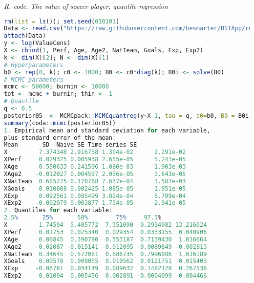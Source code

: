 \begin{tcolorbox}[enhanced,width=4.67in,center upper,
	fontupper=\large\bfseries,drop shadow southwest,sharp corners]
	\textit{R. code. The value of soccer player, quantile regression}
	\begin{VF}
		\begin{lstlisting}[language=R]
rm(list = ls()); set.seed(010101)
Data <- read.csv("https://raw.githubusercontent.com/besmarter/BSTApp/refs/heads/master/DataApp/1ValueFootballPlayers.csv", sep = ",", header = TRUE, quote = "")
attach(Data)
y <- log(ValueCens) 
X <- cbind(1, Perf, Age, Age2, NatTeam, Goals, Exp, Exp2)
k <- dim(X)[2]; N <- dim(X)[1]
# Hyperparameters
b0 <- rep(0, k); c0 <- 1000; B0 <- c0*diag(k); B0i <- solve(B0)
# MCMC parameters
mcmc <- 50000; burnin <- 10000
tot <- mcmc + burnin; thin <- 1
# Quantile
q <- 0.5
posterior05  <- MCMCpack::MCMCquantreg(y~X-1, tau = q, b0=b0, B0 = B0i, burnin = burnin, mcmc = mcmc, thin = thin)
summary(coda::mcmc(posterior05))
1. Empirical mean and standard deviation for each variable,
plus standard error of the mean:
Mean       SD  Naive SE Time-series SE
X         7.374348 2.916758 1.304e-02      2.291e-02
XPerf     0.029325 0.005938 2.655e-05      5.241e-05
XAge      0.550633 0.241596 1.080e-03      1.903e-03
XAge2    -0.012027 0.004597 2.056e-05      3.643e-05
XNatTeam  0.685275 0.170768 7.637e-04      1.587e-03
XGoals    0.010608 0.002425 1.085e-05      1.951e-05
XExp      0.092561 0.085499 3.824e-04      6.799e-04
XExp2    -0.002979 0.003877 1.734e-05      2.941e-05
2. Quantiles for each variable:
2.5%       25%       50%        75%     97.5%
X         1.74594  5.405772  7.351090  9.2994982 13.216024
XPerf     0.01753  0.025340  0.029354  0.0333155  0.040906
XAge      0.06845  0.390780  0.553187  0.7139430  1.016664
XAge2    -0.02087 -0.015141 -0.012095 -0.0089849 -0.002813
XNatTeam  0.34645  0.572081  0.686735  0.7996086  1.016189
XGoals    0.00578  0.009055  0.010562  0.0121751  0.015403
XExp     -0.06761  0.034149  0.089632  0.1482128  0.267536
XExp2    -0.01094 -0.005456 -0.002891 -0.0004099  0.004466
\end{lstlisting}
	\end{VF}
\end{tcolorbox} 

